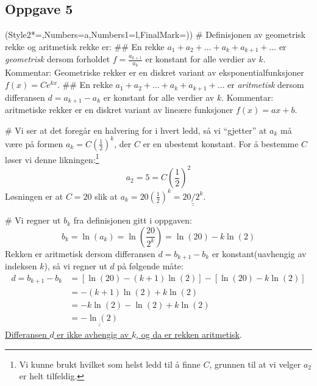\documentclass[12pt, a4paper]
{article}						%
\def\answer#1{\underline{\underline{#1}}}
\begin{document}
\subsection*{Oppgave 5}
\begin{easylist}[enumerate]
	\ListProperties(Style2*=,Numbers=a,Numbers1=l,FinalMark={)})
	# Definisjonen av geometrisk rekke og aritmetisk rekke er:
	## En rekke $a_1 + a_2 + \dots + a_k + a_{k+1} + \dots$ er \emph{geometrisk} dersom forholdet $f = \frac{a_{k+1}}{a_k}$ er konstant for alle verdier av $k$. Kommentar: Geometriske rekker er en diskret variant av eksponentialfunksjoner $f(x) = Ce^{kx}$.
	## En rekke $a_1 + a_2 + \dots + a_k + a_{k+1} + \dots$ er \emph{aritmetisk} dersom differansen $d = a_{k+1} - a_k$ er konstant for alle verdier av $k$. Kommentar: aritmetiske rekker er en diskret variant av lineære funksjoner $f(x) = ax + b$.
	
	# Vi ser at det foregår en halvering for i hvert ledd, så vi ``gjetter'' at $a_k$ må være på formen $a_k = C \left(\frac{1}{2}\right)^k$, der $C$ er en ubestemt konstant. For å bestemme $C$ løser vi denne likningen:\footnote{Vi kunne brukt hvilket som helst ledd til å finne $C$, grunnen til at vi velger $a_2$ er helt tilfeldig.}
	\begin{equation*}
		a_2 = 5 = C \left(\frac{1}{2}\right)^2
	\end{equation*}
	Løsningen er at $C = 20$ slik at $a_k = 20 \left(\frac{1}{2}\right)^k = \answer{20/2^k}$. 
	
	# Vi regner ut $b_k$ fra definisjonen gitt i oppgaven:
	\begin{equation*}
		b_k = \ln \left(a_k\right) = \ln \left(\frac{20}{2^k}\right) = \ln(20) - k \ln(2)
	\end{equation*}
	Rekken er aritmetisk dersom differansen $d = b_{k+1} - b_k$ er konstant(uavhengig av indeksen $k$), så vi regner ut $d$ på følgende måte:
	\begin{align*}
	d = b_{k+1} - b_k &= \left[\ln(20) - (k+1) \ln(2)\right] - \left[\ln(20) - k \ln(2)\right] \\
					&=  - (k+1) \ln(2)  + k \ln(2) \\
					&=  - k \ln(2) - \ln(2)  + k \ln(2) \\
					&=\answer{- \ln(2)}
	\end{align*}
	\answer{Differansen $d$ er ikke avhengig av $k$, og da er rekken aritmetisk}.
	
\end{easylist}
\end{document}
